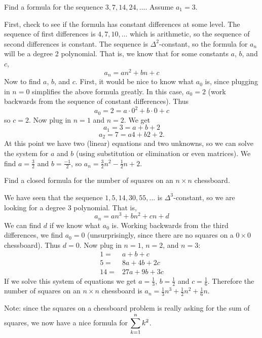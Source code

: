 \documentclass[12pt]{article}
\begin{document}
\begin{example}
  Find a formula for the sequence $3, 7, 14, 24,\ldots$. Assume $a_1 = 3$.  
  \begin{solution}
    First, check to see if the formula has constant differences at some level.  The sequence of first differences is $4, 7, 10, \ldots$ which is arithmetic, so the sequence of second differences is constant.  The sequence is $\Delta^2$-constant, so the formula for $a_n$ will be a degree 2 polynomial.  That is, we know that for some constants $a$, $b$, and $c$,
    \[a_n = an^2 + bn + c\]
    Now to find $a$, $b$, and $c$.  First, it would be nice to know what $a_0$ is, since plugging in $n = 0$ simplifies the above formula greatly.  In this case, $a_0 = 2$ (work backwards from the sequence of constant differences).  Thus
    \[a_0 = 2 = a\cdot 0^2 + b \cdot 0 + c\]
    so $c = 2$.  Now plug in $n =1$ and $n = 2$.  We get 
    \[a_1 = 3 = a + b + 2\]
    \[a_2 = 7 = a4 + b 2 + 2.\]  At this point we have two (linear) equations and two unknowns, so we can solve the system for $a$ and $b$ (using substitution or elimination or even matrices).  We find $a = \frac{3}{2}$ and $b = \frac{-1}{2}$, so $a_n = \frac{3}{2} n^2 - \frac{1}{2}n + 2$.
  \end{solution}

\end{example}


\begin{example}
  Find a closed formula for the number of squares on an $n \times n$ chessboard.
  \begin{solution}
    We have seen that the sequence $1, 5, 14, 30, 55, \ldots$ is $\Delta^3$-constant, so we are looking for a degree 3 polynomial.  That is, 
    \[a_n = an^3 + bn^2 + cn + d\]
    We can find $d$ if we know what $a_0$ is.  Working backwards from the third differences, we find $a_0 = 0$ (unsurprisingly, since there are no squares on a $0\times 0$ chessboard).  Thus $d = 0$.  Now plug in $n = 1$, $n =2$, and $n =3$:
    \begin{align*}
      1 = & a + b + c \\
      5 = & 8a + 4b + 2c \\
      14 = & 27a + 9b + 3c
    \end{align*}
    If we solve this system of equations we get $a = \frac{1}{3}$, $b = \frac{1}{2}$ and $c = \frac{1}{6}$.  Therefore the number of squares on an $n \times n$ chessboard is $a_n = \frac{1}{3}n^3 + \frac{1}{2}n^2 + \frac{1}{6}n$.
  \end{solution}
  
  Note: since the squares on a chessboard problem is really asking for the sum of squares, we now have a nice formula for $\displaystyle\sum_{k=1}^n k^2$.
\end{example}
\end{document}
